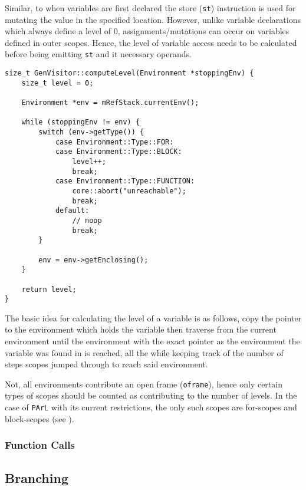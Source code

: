 Similar, to when variables are first declared the store
(\texttt{st}) instruction is used for mutating the value in the
specified location. However, unlike variable declarations which
always define a level of $0$, assignments/mutations can occur on
variables defined in outer scopes. Hence, the level of variable
access needs to be calculated before being emitting \texttt{st}
and it necessary operands.

\begin{lstlisting}[caption={The \texttt{computeLevel()} method
in the \texttt{GenVisitor} class (ir\_gen/GenVisitor.cpp)},
label=lst:computelevel]
size_t GenVisitor::computeLevel(Environment *stoppingEnv) {
    size_t level = 0;

    Environment *env = mRefStack.currentEnv();

    while (stoppingEnv != env) {
        switch (env->getType()) {
            case Environment::Type::FOR:
            case Environment::Type::BLOCK:
                level++;
                break;
            case Environment::Type::FUNCTION:
                core::abort("unreachable");
                break;
            default:
                // noop
                break;
        }

        env = env->getEnclosing();
    }

    return level;
}
\end{lstlisting}

The basic idea for calculating the level of a variable is
as follows, copy the pointer to the environment which holds
the variable then traverse from the current environment until
the environment with the exact pointer as the environment
the variable was found in is reached, all the while keeping track
of the number of steps scopes jumped through to reach said
environment.

\begin{note}
Not, all environments contribute an open frame
(\texttt{oframe}), hence only certain types of scopes should be
counted as contributing to the number of levels. In the case of
\texttt{PArL} with its current restrictions, the only such
scopes are for-scopes and block-scopes (see
).
\end{note}

\subsubsection{Function Calls}

\subsection{Branching}
